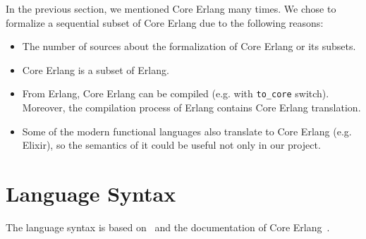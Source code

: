 \documentclass[12pt]{article}
\theoremstyle{definition}
\numberwithin{equation}{section}
\begin{document}
In the previous section, we mentioned Core Erlang many times. We chose to formalize a sequential subset of Core Erlang due to the following reasons:

\begin{itemize}
	\item The number of sources about the formalization of Core Erlang or its subsets.
	\item Core Erlang is a subset of Erlang.
	\item From Erlang, Core Erlang can be compiled (e.g. with \verb|to_core| switch). Moreover, the compilation process of Erlang contains Core Erlang translation.
	\item Some of the modern functional languages also translate to Core Erlang (e.g. Elixir), so the semantics of it could be useful not only in our project.
\end{itemize}

\section{Language Syntax}\label{S:syntax}

The language syntax is based on~\cite{nishida2016reversible} and the documentation of Core Erlang~\cite{carlsson2000core}. 
\end{document}
